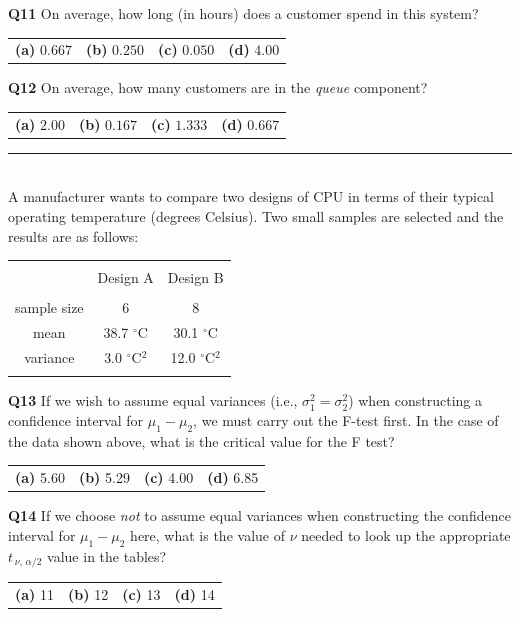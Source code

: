 \documentclass[12pt]{article}
\begin{document}
{\bf Q11} On average, how long (in hours) does a customer spend in this system?\\[0.2cm]
\begin{tabular}{cccc}
{\bf(a)} $0.667$ & {\bf(b)} $0.250$ & {\bf(c)} $0.050$ & {\bf(d)} $4.00$ \\[0.6cm]
\end{tabular}

{\bf Q12} On average, how many customers are in the \emph{queue} component?\\[0.2cm]
\begin{tabular}{cccc}
{\bf(a)} $2.00$ & {\bf(b)} $0.167$ & {\bf(c)} $1.333$ & {\bf(d)} $0.667$ \\[0.6cm]
\end{tabular}


\rule{\linewidth}{1pt}
\quad\\
A manufacturer wants to compare two designs of CPU in terms of their typical operating temperature (degrees Celsius). Two small samples are selected and the results are as follows:
\begin{small}
\begin{center}
\begin{tabular}{|c|c|c|}
\hline
&&\\[-0.3cm]
& Design A & Design B \\
\hline
&&\\[-0.2cm]
sample size      & 6 & 8 \\[0.2cm]
mean   & 38.7 $^\circ$C & 30.1 $^\circ$C \\[0.2cm]
variance &  3.0 $^\circ$C$^2$ & 12.0 $^\circ$C$^2$ \\[0.2cm]
\hline
\multicolumn{3}{c}{}
\end{tabular}
\end{center}
\end{small}


{\bf Q13} If we wish to assume equal variances (i.e., $\sigma_1^2=\sigma_2^2$) when constructing a confidence interval for $\mu_1-\mu_2$, we must carry out the F-test first. In the case of the data shown above, what is the critical value for the F test? \\[0.2cm]
\begin{tabular}{cccc}
{\bf(a)} 5.60 & {\bf(b)} 5.29 & {\bf(c)} 4.00 & {\bf(d)} 6.85 \\[0.6cm]
\end{tabular}

{\bf Q14} If we choose \emph{not} to assume equal variances when constructing the confidence interval for $\mu_1-\mu_2$ here, what is the value of $\nu$ needed to look up the appropriate $t_{\,\nu,\,\alpha/2}$ value in the tables?\\[0.2cm]
\begin{tabular}{cccc}
{\bf(a)} 11 & {\bf(b)} 12  & {\bf(c)} 13 & {\bf(d)} 14 \\[0.6cm]
\end{tabular}
\end{document}
